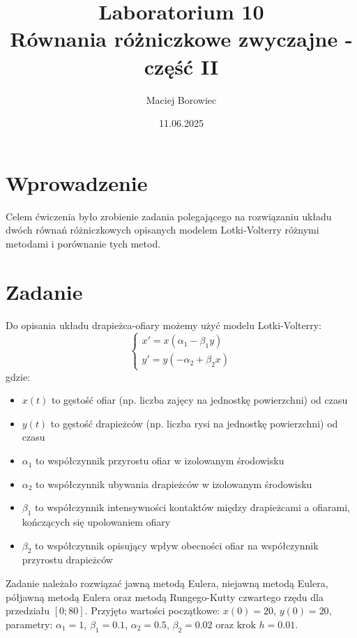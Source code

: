 \documentclass{article}
\title{Laboratorium 10 \\ Równania różniczkowe zwyczajne - część II}
\author{Maciej Borowiec}
\date{11.06.2025}
\begin{document}
\maketitle

\section{Wprowadzenie}
Celem ćwiczenia było zrobienie zadania polegającego na rozwiązaniu układu dwóch równań różniczkowych opisanych modelem Lotki-Volterry różnymi metodami i porównanie tych metod.

\section{Zadanie}
Do opisania układu drapieżca-ofiary możemy użyć modelu Lotki-Volterry:
\begin{equation}
    \begin{cases}
        x' = x(\alpha_1 - \beta_1y) \\
        y' = y(-\alpha_2 + \beta_2x)
    \end{cases} \nonumber
\end{equation}
gdzie:
\begin{itemize}
\item $x(t)$ to gęstość ofiar (np. liczba zajęcy na jednostkę powierzchni) od czasu
\item $y(t)$ to gęstość drapieżców (np. liczba rysi na jednostkę powierzchni) od czasu
\item $\alpha_1$ to współczynnik przyrostu ofiar w izolowanym środowisku
\item $\alpha_2$ to współczynnik ubywania drapieżców w izolowanym środowisku
\item $\beta_1$ to współczynnik intensywności kontaktów między drapieżcami a ofiarami, kończących się upolowaniem ofiary
\item $\beta_2$ to współczynnik opisujący wpływ obecności ofiar na współczynnik przyrostu drapieżców
\end{itemize}
Zadanie należało rozwiązać jawną metodą Eulera, niejawną metodą Eulera, półjawną metodą Eulera oraz metodą Rungego-Kutty czwartego rzędu dla przedziału $[0;80]$. Przyjęto wartości początkowe: $x(0) = 20$, $y(0) = 20$, parametry: $\alpha_1 = 1$, $\beta_1 = 0.1$, $\alpha_2 = 0.5$, $\beta_2 = 0.02$ oraz krok $h = 0.01$.
\end{document}
